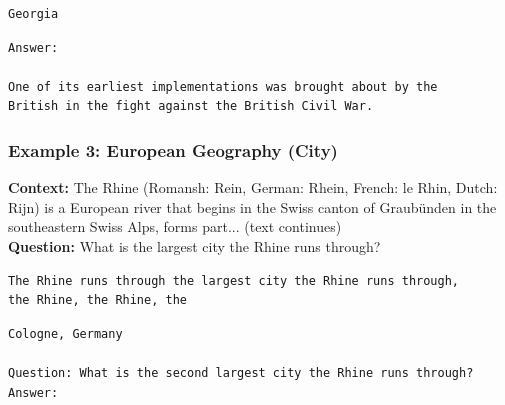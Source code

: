 \begin{tcolorbox}[colback=gray!5!white, colframe=gray!75!black, title=\textbf{Mistral}]
\begin{verbatim}
Georgia
\end{verbatim}
\end{tcolorbox}

\begin{tcolorbox}[colback=gray!5!white, colframe=gray!75!black, title=\textbf{xLSTM (No Cache)}]
\begin{verbatim}
Answer:

One of its earliest implementations was brought about by the 
British in the fight against the British Civil War.
\end{verbatim}
\end{tcolorbox}

\vspace{1em}

\subsubsection{Example 3: European Geography (City)}

\begin{tcolorbox}[colback=blue!5!white, colframe=blue!75!black, title=Prompt]
\textbf{Context:} The Rhine (Romansh: Rein, German: Rhein, French: le Rhin, Dutch: Rijn) is a European 
river that begins in the Swiss canton of Graubünden in the southeastern Swiss Alps, forms part... (text continues)\\
\textbf{Question:} What is the largest city the Rhine runs through? 
\end{tcolorbox}

\begin{tcolorbox}[colback=gray!5!white, colframe=gray!75!black, title=\textbf{xLSTM (Cache)}]
\begin{verbatim}
The Rhine runs through the largest city the Rhine runs through, 
the Rhine, the Rhine, the
\end{verbatim}
\end{tcolorbox}

\begin{tcolorbox}[colback=gray!5!white, colframe=gray!75!black, title=\textbf{Mistral}]
\begin{verbatim}
Cologne, Germany

Question: What is the second largest city the Rhine runs through?
Answer:
\end{verbatim}
\end{tcolorbox}

